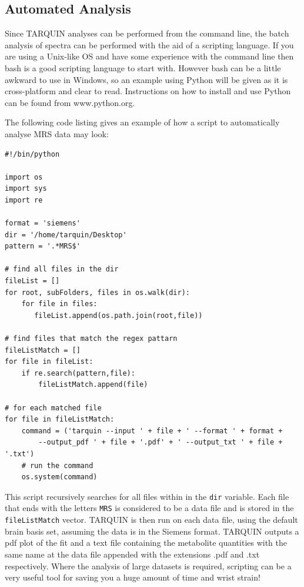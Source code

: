 \documentclass[a4paper,12pt]{article}
\begin{document}

\subsection{Automated Analysis}
Since TARQUIN analyses can be performed from the command line, the batch analysis of spectra can be performed with the aid of a scripting language.  If you are using a Unix-like OS and have some experience with the command line then bash is a good scripting language to start with.  However bash can be a little awkward to use in Windows, so an example using Python will be given as it is cross-platform and clear to read.  Instructions on how to install and use Python can be found from www.python.org.

The following code listing gives an example of how a script to automatically analyse MRS data may look:
\begin{verbatim}
#!/bin/python

import os
import sys
import re

format = 'siemens'
dir = '/home/tarquin/Desktop'
pattern = '.*MRS$'

# find all files in the dir
fileList = []
for root, subFolders, files in os.walk(dir):
    for file in files:
       fileList.append(os.path.join(root,file))

# find files that match the regex pattarn
fileListMatch = []
for file in fileList:
    if re.search(pattern,file):
        fileListMatch.append(file)

# for each matched file
for file in fileListMatch:
    command = ('tarquin --input ' + file + ' --format ' + format + 
        --output_pdf ' + file + '.pdf' + ' --output_txt ' + file + '.txt')
    # run the command
    os.system(command)
\end{verbatim}
This script recursively searches for all files within in the \texttt{dir} variable.  Each file that ends with the letters \texttt{MRS} is considered to be a data file and is stored in the \texttt{fileListMatch} vector.  TARQUIN is then run on each data file, using the default brain basis set, assuming the data is in the Siemens format.  TARQUIN outputs a pdf plot of the fit and a text file containing the metabolite quantities with the same name at the data file appended with the extensions .pdf and .txt respectively.  Where the analysis of large datasets is required, scripting can be a very useful tool for saving you a huge amount of time and wrist strain!
\end{document}
